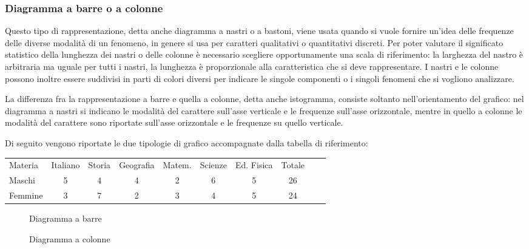 \subsubsection{Diagramma a barre o a colonne}
Questo tipo di rappresentazione, detta anche diagramma a nastri o a 
bastoni, viene usata quando si vuole fornire un'idea delle frequenze
delle diverse modalità di un fenomeno, in genere si usa per caratteri 
qualitativi o quantitativi discreti.
Per poter valutare il significato statistico della lunghezza dei nastri o 
delle colonne è necessario scegliere opportunamente una scala di 
riferimento:
la larghezza del nastro è arbitraria ma uguale per tutti i nastri, la 
lunghezza è proporzionale alla caratteristica che si deve rappresentare.
I nastri e le colonne possono inoltre essere suddivisi in parti di colori 
diversi per indicare le singole componenti o i singoli fenomeni
che si vogliono analizzare.

La differenza fra la rappresentazione a barre e quella a colonne, detta 
anche istogramma, consiste soltanto
nell'orientamento del grafico: nel diagramma a nastri si indicano le 
modalità del carattere sull'asse verticale e le frequenze sull'asse 
orizzontale,
mentre in quello a colonne le modalità del carattere sono riportate 
sull'asse
orizzontale e le frequenze su quello verticale.

Di seguito vengono riportate le due tipologie di grafico accompagnate dalla 
tabella di riferimento:

\begin{center}
 \begin{tabularx}{.95\textwidth}{X*{7}{c}Xc}
\toprule
Materia& Italiano &Storia & Geografia & Matem. & Scienze & Ed. Fisica & 
Totale\\
Maschi & 5 & 4& 4 & 2& 6 & 5& 26\\
Femmine & 3 & 7 & 2 & 3  & 4 & 5 & 24\\
\bottomrule
\end{tabularx}
\end{center}
\begin{center}
\begin{inaccessibleblock}
 \begin{figure}[t]

\caption{Diagramma a barre}
\end{figure}
\end{inaccessibleblock}
\end{center}

\begin{center}
 \begin{inaccessibleblock}
 \begin{figure}[!ht]

\caption{Diagramma a colonne}
\end{figure}
\end{inaccessibleblock}
\end{center}

